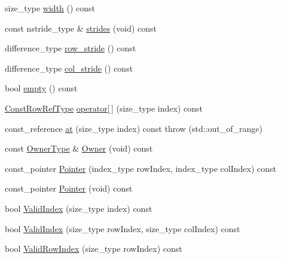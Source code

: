 \begin{DoxyCompactItemize}
\item 
size\-\_\-type \hyperlink{classvct_dynamic_const_matrix_base_ad12c441266a5e5114074114877d762f5}{width} () const 
\item 
const nstride\-\_\-type \& \hyperlink{classvct_dynamic_const_matrix_base_a5796ed8bbf3d2609872a9f710db17e17}{strides} (void) const 
\item 
difference\-\_\-type \hyperlink{classvct_dynamic_const_matrix_base_a59334df55c8726ae084c2f0ae5fef337}{row\-\_\-stride} () const 
\item 
difference\-\_\-type \hyperlink{classvct_dynamic_const_matrix_base_ac0150b5ab06cdfec0c6e0778a2725ab7}{col\-\_\-stride} () const 
\item 
bool \hyperlink{classvct_dynamic_const_matrix_base_ae8170958e8d2b04aaa0285d29a238afb}{empty} () const 
\item 
\hyperlink{classvct_dynamic_const_matrix_base_a42a300cb1afd5f0602ba5c2d7d9cc40b}{Const\-Row\-Ref\-Type} \hyperlink{classvct_dynamic_const_matrix_base_ac6bc039b7cf7b641041365d4824455d7}{operator\mbox{[}$\,$\mbox{]}} (size\-\_\-type index) const 
\item 
const\-\_\-reference \hyperlink{classvct_dynamic_const_matrix_base_af6b16c73de98ab7993e93dbecebbeb55}{at} (size\-\_\-type index) const   throw (std\-::out\-\_\-of\-\_\-range)
\item 
const \hyperlink{classvct_dynamic_const_matrix_base_a2e37ebc2ac741d4346d21f986e625e96}{Owner\-Type} \& \hyperlink{classvct_dynamic_const_matrix_base_aade024ac6cf9570aab8a83af991c4154}{Owner} (void) const 
\item 
const\-\_\-pointer \hyperlink{classvct_dynamic_const_matrix_base_abea6ac985704e38800b3397f648e1657}{Pointer} (index\-\_\-type row\-Index, index\-\_\-type col\-Index) const 
\item 
const\-\_\-pointer \hyperlink{classvct_dynamic_const_matrix_base_ae0be4d2fc6a79184f0342cdc4f849044}{Pointer} (void) const 
\item 
bool \hyperlink{classvct_dynamic_const_matrix_base_a26eaf9feba8311e03c3335b71a6360aa}{Valid\-Index} (size\-\_\-type index) const 
\item 
bool \hyperlink{classvct_dynamic_const_matrix_base_a3658682e2353a3335dea4e8ed9976745}{Valid\-Index} (size\-\_\-type row\-Index, size\-\_\-type col\-Index) const 
\item 
bool \hyperlink{classvct_dynamic_const_matrix_base_a949b4fd96c32c84c9a6710a39a66d8dc}{Valid\-Row\-Index} (size\-\_\-type row\-Index) const 
\item 

\end{DoxyCompactItemize}
